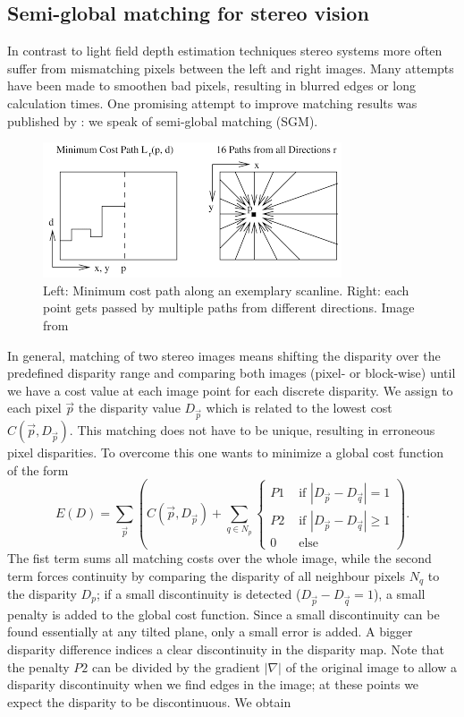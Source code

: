 \documentclass  [
  paper    = a4,
  BCOR     = 10mm,
  twoside,
  fontsize = 12pt,
  fleqn,
  toc      = bibnumbered,
  toc      = listofnumbered,
  numbers  = noendperiod,
  headings = normal,
  listof   = leveldown,
  version  = 3.03
]                                       {scrreprt}
\begin{document}
\subsection{Semi-global matching for stereo vision}
In contrast to light field depth estimation techniques stereo systems more often suffer from mismatching pixels between the left and right images. Many attempts have been made to smoothen bad pixels, resulting in blurred edges or long calculation times. One promising attempt to improve matching results was published by \cite{hirschmuller2005accurate}: we speak of semi-global matching (SGM).
\begin{figure}[h!]
	\centering
	\includegraphics[width=0.7\linewidth]{images/sgm_paths}
	\caption[SGM Path explanation]{Left: Minimum cost path along an exemplary scanline. Right: each point gets passed by multiple paths from different directions. Image from\cite{hirschmuller2008stereo}}
	\label{fig:sgmpaths}
\end{figure}
In general,  matching of two stereo images means shifting the disparity over the predefined disparity range and comparing both images (pixel- or block-wise) until we have a cost value at each image point for each discrete disparity. We assign to each pixel $\vec{p}$ the disparity value $D_{\vec p}$ which is related to the lowest cost $C(\vec{p}, D_{\vec p})$. This matching does not have to be unique, resulting in erroneous pixel disparities. 
To overcome this one wants to minimize a global cost function of the form 
\begin{equation}\label{eq:global_sgm}
E(D) = \sum_{\vec p} \left(C(\vec{p}, D_{\vec p}) + \sum_{q\in N_p} 
\begin{cases}
	P1 & \text{ if }|D_{\vec p} - D_{\vec q}| = 1\\
	P2 & \text{ if }|D_{\vec p} - D_{\vec q}| \geq 1\\
	0 & \text{ else }
	\end{cases}  
\right).
\end{equation}
The fist term sums all matching costs over the whole image, while the second term forces continuity by comparing the disparity of all neighbour pixels $N_q$ to the disparity $D_p$; if a  small discontinuity is detected ($D_{\vec p} - D_{\vec q} = 1$), a small penalty is added to the global cost function. Since a small discontinuity can be found essentially at any tilted plane, only a small error is added. A bigger disparity difference indices a clear discontinuity in the disparity map. Note that the penalty $P2$ can be divided by the gradient $|\nabla|$ of the original image to allow a disparity discontinuity when we find edges in the image; at these points we expect the disparity to be discontinuous. We obtain
\end{document}
